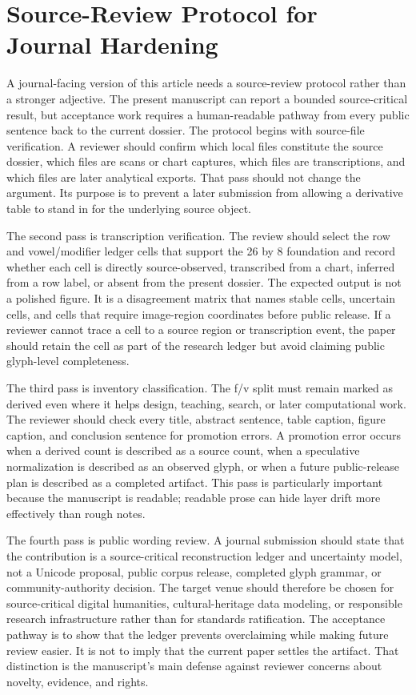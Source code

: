 \documentclass[sigconf,nonacm]{acmart}
\begin{document}
\section{Source-Review Protocol for Journal Hardening}
A journal-facing version of this article needs a source-review protocol rather
than a stronger adjective. The present manuscript can report a bounded
source-critical result, but acceptance work requires a human-readable pathway
from every public sentence back to the current dossier. The protocol begins with
source-file verification. A reviewer should confirm which local files constitute
the source dossier, which files are scans or chart captures, which files are
transcriptions, and which files are later analytical exports. That pass should
not change the argument. Its purpose is to prevent a later submission from
allowing a derivative table to stand in for the underlying source object.

The second pass is transcription verification. The review should select the row
and vowel/modifier ledger cells that support the 26 by 8 foundation and record
whether each cell is directly source-observed, transcribed from a chart, inferred
from a row label, or absent from the present dossier. The expected output is not
a polished figure. It is a disagreement matrix that names stable cells,
uncertain cells, and cells that require image-region coordinates before public
release. If a reviewer cannot trace a cell to a source region or transcription
event, the paper should retain the cell as part of the research ledger but avoid
claiming public glyph-level completeness.

The third pass is inventory classification. The f/v split must remain marked as
derived even where it helps design, teaching, search, or later computational
work. The reviewer should check every title, abstract sentence, table caption,
figure caption, and conclusion sentence for promotion errors. A promotion error
occurs when a derived count is described as a source count, when a speculative
normalization is described as an observed glyph, or when a future public-release
plan is described as a completed artifact. This pass is particularly important
because the manuscript is readable; readable prose can hide layer drift more
effectively than rough notes.

The fourth pass is public wording review. A journal submission should state that
the contribution is a source-critical reconstruction ledger and uncertainty
model, not a Unicode proposal, public corpus release, completed glyph grammar, or
community-authority decision. The target venue should therefore be chosen for
source-critical digital humanities, cultural-heritage data modeling, or
responsible research infrastructure rather than for standards ratification. The
acceptance pathway is to show that the ledger prevents overclaiming while making
future review easier. It is not to imply that the current paper settles the
artifact. That distinction is the manuscript's main defense against reviewer
concerns about novelty, evidence, and rights.
\end{document}
